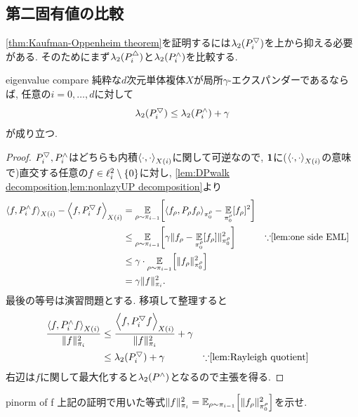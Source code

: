 \subsection{第二固有値の比較}
\cref{thm:Kaufman-Oppenheim theorem}を証明するには$\lambda_2(P^{\bigtriangledown}_i)$を上から抑える必要がある.
そのためにまず$\lambda_2(P^{\triangle}_i)$と$\lambda_2(P^{\land}_i)$を比較する.
\begin{lemma}{}{eigenvalue compare}
    純粋な$d$次元単体複体$X$が局所$\gamma$-エクスパンダーであるならば, 任意の$i=0,\dots,d$に対して
    \[ \lambda_2(P^{\bigtriangledown}_i) \le \lambda_2(P^{\land}_i) + \gamma \]
    が成り立つ.
\end{lemma}
\begin{proof}
    $P^{\bigtriangledown}_i,P^{\land}_i$はどちらも内積$\left\langle\cdot,\cdot\right\rangle_{X(i)}$に関して可逆なので,
    $\mathbf{1}$に($\left\langle\cdot,\cdot\right\rangle_{X(i)}$の意味で)直交する任意の$f \in \ell^2_{i} \setminus\{0\}$に対し,
    \cref{lem:DPwalk decomposition,lem:nonlazyUP decomposition}より
    \begin{align*}
        \iprod{f,\nonlazyPUD_i f} - \iprod{f,\PDU_i f} &= \E_{\rho\sim\pi_{i-1}}\sbra*{ \abra*{f_\rho, P_\rho f_\rho}_{\pi_0^\rho} - \E_{\pi^\rho_0}[f_\rho]^2}  \\
        & \le \E_{\rho\sim\pi_{i-1}}\sbra*{\gamma \norm{f_\rho - \E_{\pi^\rho_0}[f_\rho]}_{\pi^\rho_0}^2 } & & \text{$\because$\cref{lem:one side EML}} \\
        &\le \gamma \cdot \E_{\rho\sim\pi_{i-1}}\sbra*{\norm{f_\rho}^2_{\pi^\rho_0}} \\
        &= \gamma \norm{f}^2_{\pi_i}.
    \end{align*}
    最後の等号は演習問題とする.
    移項して整理すると
    \begin{align*}
        \frac{\iprod{f,\nonlazyPUD_i f}}{\norm{f}_{\pi_i}^2} &\le \frac{\iprod{f,\PDU_if}}{\norm{f}^2_{\pi_i}} + \gamma \\
        & \le \lambda_2(\PDU_i) + \gamma & & \text{$\because$\cref{lem:Rayleigh quotient}}
    \end{align*}
    右辺は$f$に関して最大化すると$\lambda_2(P^{\land})$となるので主張を得る.
\end{proof}

\begin{exercise}{}{pinorm of f}
    上記の証明で用いた等式$\norm{f}_{\pi_i}^2  = \E_{\rho \sim \pi_{i-1}}\sbra*{\norm{f_\rho}^2_{\pi^\rho_0}}$を示せ.
\end{exercise}

